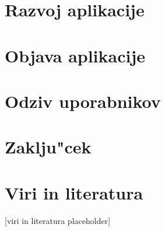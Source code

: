 \documentclass[a4paper, 12pt]{article}
\begin{document}
	\section{Razvoj aplikacije}
	
	
	\section{Objava aplikacije}
	
	
	\section{Odziv uporabnikov}
	
	
	\section{Zaklju"cek}
	
	
	\section{Viri in literatura}
	[viri in literatura placeholder]
\end{document}
